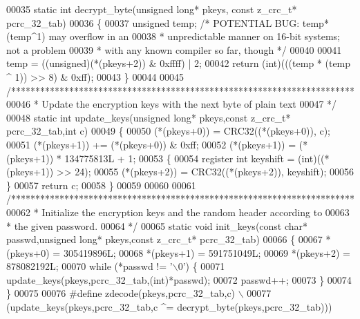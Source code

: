 \begin{DoxyCode}
00035 \textcolor{keyword}{static} \textcolor{keywordtype}{int} decrypt\_byte(\textcolor{keywordtype}{unsigned} \textcolor{keywordtype}{long}* pkeys, \textcolor{keyword}{const} z\_crc\_t* pcrc\_32\_tab)
00036 \{
00037     \textcolor{keywordtype}{unsigned} temp;  \textcolor{comment}{/* POTENTIAL BUG:  temp*(temp^1) may overflow in an}
00038 \textcolor{comment}{                     * unpredictable manner on 16-bit systems; not a problem}
00039 \textcolor{comment}{                     * with any known compiler so far, though */}
00040 
00041     temp = ((unsigned)(*(pkeys+2)) & 0xffff) | 2;
00042     \textcolor{keywordflow}{return} (\textcolor{keywordtype}{int})(((temp * (temp ^ 1)) >> 8) & 0xff);
00043 \}
00044 
00045 \textcolor{comment}{/***********************************************************************}
00046 \textcolor{comment}{ * Update the encryption keys with the next byte of plain text}
00047 \textcolor{comment}{ */}
00048 \textcolor{keyword}{static} \textcolor{keywordtype}{int} update\_keys(\textcolor{keywordtype}{unsigned} \textcolor{keywordtype}{long}* pkeys,\textcolor{keyword}{const} z\_crc\_t* pcrc\_32\_tab,\textcolor{keywordtype}{int} c)
00049 \{
00050     (*(pkeys+0)) = CRC32((*(pkeys+0)), c);
00051     (*(pkeys+1)) += (*(pkeys+0)) & 0xff;
00052     (*(pkeys+1)) = (*(pkeys+1)) * 134775813L + 1;
00053     \{
00054       \textcolor{keyword}{register} \textcolor{keywordtype}{int} keyshift = (int)((*(pkeys+1)) >> 24);
00055       (*(pkeys+2)) = CRC32((*(pkeys+2)), keyshift);
00056     \}
00057     \textcolor{keywordflow}{return} c;
00058 \}
00059 
00060 
00061 \textcolor{comment}{/***********************************************************************}
00062 \textcolor{comment}{ * Initialize the encryption keys and the random header according to}
00063 \textcolor{comment}{ * the given password.}
00064 \textcolor{comment}{ */}
00065 \textcolor{keyword}{static} \textcolor{keywordtype}{void} init\_keys(\textcolor{keyword}{const} \textcolor{keywordtype}{char}* passwd,\textcolor{keywordtype}{unsigned} \textcolor{keywordtype}{long}* pkeys,\textcolor{keyword}{const} z\_crc\_t* pcrc\_32\_tab)
00066 \{
00067     *(pkeys+0) = 305419896L;
00068     *(pkeys+1) = 591751049L;
00069     *(pkeys+2) = 878082192L;
00070     \textcolor{keywordflow}{while} (*passwd != \textcolor{charliteral}{'\(\backslash\)0'}) \{
00071         update\_keys(pkeys,pcrc\_32\_tab,(\textcolor{keywordtype}{int})*passwd);
00072         passwd++;
00073     \}
00074 \}
00075 
00076 \textcolor{preprocessor}{#define zdecode(pkeys,pcrc\_32\_tab,c) \(\backslash\)}
00077 \textcolor{preprocessor}{    (update\_keys(pkeys,pcrc\_32\_tab,c ^= decrypt\_byte(pkeys,pcrc\_32\_tab)))}

\end{DoxyCode}
